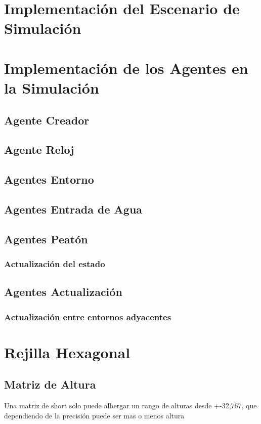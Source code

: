 \section*{Implementación del Escenario de Simulación}
\section*{Implementación de los Agentes en la Simulación}
\subsection*{Agente Creador}
\subsection*{Agente Reloj}
\subsection*{Agentes Entorno}
\subsection*{Agentes Entrada de Agua}
\subsection*{Agentes Peatón}
\subsubsection*{Actualización del estado}
\subsection*{Agentes Actualización}
\subsubsection*{Actualización entre entornos adyacentes}
\section*{Rejilla Hexagonal}
\subsection*{Matriz de Altura}
Una matriz de short solo puede albergar un rango de alturas desde +-32,767, que
dependiendo de la precisión puede ser mas o menos altura
